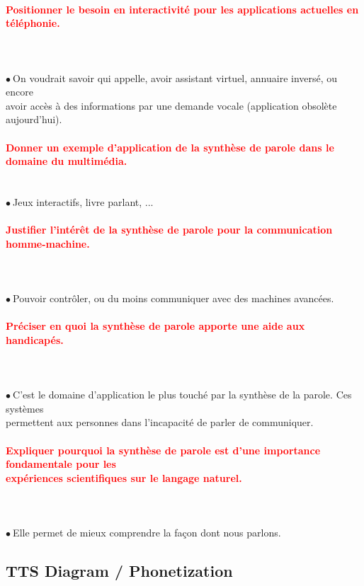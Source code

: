 \documentclass[letterpaper, 12pt]{article}
\newcommand{\alinea}{
\hspace*{0.3cm}}
\newcommand{\red}[1]{
	\textcolor{red}{#1}
}
\newcommand{\point}{$\bullet\ $}
\begin{document}
		\paragraph{\red{Positionner le besoin en interactivité pour les applications actuelles en téléphonie.}}~\\~\\
			\point On voudrait savoir qui appelle, avoir assistant virtuel, annuaire inversé, ou encore
				\\\alinea avoir accès à des informations par une demande vocale	(application obsolète aujourd'hui).
		\paragraph{\red{Donner un exemple d'application de la synthèse de parole dans le domaine du multimédia.}}
		~\\
			\point Jeux interactifs, livre parlant, ...
		\paragraph{\red{Justifier l'intérêt de la synthèse de parole pour la communication homme-machine.}}~\\~\\
			\point Pouvoir contrôler, ou du moins communiquer avec des machines avancées.
		\paragraph{\red{Préciser en quoi la synthèse de parole apporte une aide aux handicapés.}}~\\~\\
			\point C'est le domaine d'application le plus touché par la synthèse de la parole. Ces systèmes
				\\\alinea permettent aux personnes dans l'incapacité de parler de communiquer.
		\paragraph{\red{Expliquer pourquoi la synthèse de parole est d'une importance fondamentale pour les
		~\\ \hspace*{0.035cm} expériences scientifiques sur le langage naturel.}}~\\~\\
			\point Elle permet de mieux comprendre la façon dont nous parlons.
	\subsection{TTS Diagram / Phonetization}
		
\end{document}
